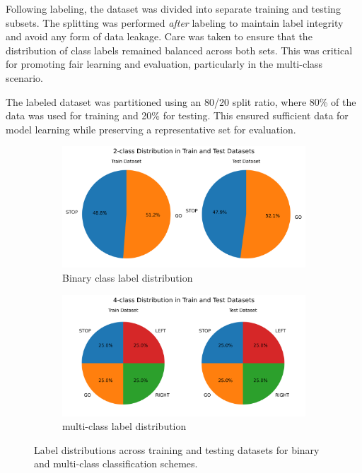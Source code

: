 Following labeling, the dataset was divided into separate training and testing subsets. The splitting was performed \textit{after} labeling to maintain label integrity and avoid any form of data leakage. Care was taken to ensure that the distribution of class labels remained balanced across both sets. This was critical for promoting fair learning and evaluation, particularly in the multi-class scenario.

The labeled dataset was partitioned using an 80/20 split ratio, where 80\% of the data was used for training and 20\% for testing. This ensured sufficient data for model learning while preserving a representative set for evaluation.

\begin{figure}
    \centering
    \begin{subfigure}{0.48\textwidth}
        \centering
        \includegraphics[width=\linewidth]{img/dataset/2-class_distribution_pie_chart.png}
        \caption{Binary class label distribution}
        \label{fig:binary_class_distribution}
    \end{subfigure}
    \hfill
    \begin{subfigure}{0.5\textwidth}
        \centering
        \includegraphics[width=\linewidth]{img/dataset/4-class_distribution_pie_chart.png}
        \caption{multi-class label distribution}
        \label{fig:class_distribution_pie}
    \end{subfigure}
    \caption{Label distributions across training and testing datasets for binary and multi-class classification schemes.}
    \label{fig:label_distribution_combined}
\end{figure}


